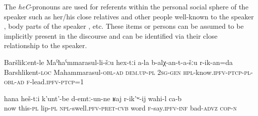 The \textit{heC}-pronouns are used for referents within the personal social sphere of the speaker such as her/his close relatives and other people well-known to the speaker , body parts of the speaker , etc. These items or persons can be assumed to be implicitly present in the discourse and can be identified via their close relationship to the speaker.
%
\begin{exe}
	\ex	\label{To Bashlikent, to MR, to the ones that you know we will bring you}
	\gll 	Baršlikːent-le	Maˁħaˁmmarasul-li-šːu	hex-tːi	a-la	b-alχ-an-t-a-šːu	r-ik-an=da \\
		Barshlikent-\textsc{loc}	Mahammarasul-\textsc{obl-ad}	\textsc{dem.up-pl}	\textsc{2sg-gen}	\textsc{hpl}-know.\textsc{ipfv}-\textsc{ptcp}-\textsc{pl}-\textsc{obl-ad} \textsc{f}-lead.\textsc{ipfv}-\textsc{ptcp}=1\\
	\glt	{}

	\ex	\label{Now the (i.e. my) lips are swollen, it is difficult to talk}
	\gll	hana	heš-tːi	k'unt'-be	d-emtː-un-ne		ʁaj	r-ik'ʷ-ij	wahi-l	ca-b \\
now	this-\textsc{pl}	lip-\textsc{pl}	\textsc{npl}-swell.\textsc{pfv}-\textsc{pret}-\textsc{cvb}	word	\textsc{f}-say.\textsc{ipfv}-\textsc{inf}	bad-\textsc{advz}	\textsc{cop-n}\\
	\glt	{}
\end{exe}

